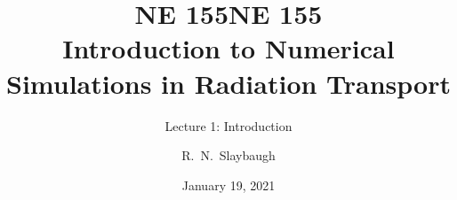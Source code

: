 \documentclass[xcolor=x11names,compress, handout]{beamer}
\title{NE 155}
\author{R.\ N.\ Slaybaugh}
\date{January 19, 2021}
\renewcommand{\(}{\begin{columns}}
\renewcommand{\)}{\end{columns}}
\newcommand{\<}[1]{\begin{column}{#1}}
\renewcommand{\>}{\end{column}}
\begin{document}
\begin{frame}
\title{NE 155\\Introduction to Numerical Simulations in Radiation Transport}
\subtitle{Lecture 1: Introduction}
\titlepage
\end{frame}


\end{document}
